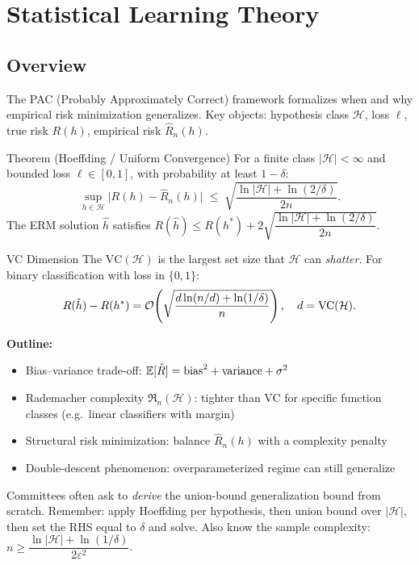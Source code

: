 \section{Statistical Learning Theory}

\subsection{Overview}
The PAC (Probably Approximately Correct) framework formalizes when and why empirical risk
minimization generalizes. Key objects: hypothesis class $\mathcal{H}$, loss $\ell$,
true risk $R(h)$, empirical risk $\hat{R}_n(h)$.

\begin{keyresult}{Theorem (Hoeffding / Uniform Convergence)}
For a finite class $|\mathcal{H}|<\infty$ and bounded loss
$\ell\in[0,1]$, with probability at least $1-\delta$:
\[
  \sup_{h\in\mathcal{H}}\bigl|R(h)-\hat{R}_n(h)\bigr|
  \;\le\; \sqrt{\frac{\ln|\mathcal{H}|+\ln(2/\delta)}{2n}}.
\]
The ERM solution $\hat{h}$ satisfies
$R(\hat{h}) \le R(h^*) + 2\sqrt{\dfrac{\ln|\mathcal{H}|+\ln(2/\delta)}{2n}}$.
\end{keyresult}

\begin{defbox}{VC Dimension}
The  $\mathrm{VC}(\mathcal{H})$ is the largest set size that
$\mathcal{H}$ can \emph{shatter}. For binary classification with loss in $\{0,1\}$:
\[
  R(\hat{h})-R(h^*) = \mathcal{O}\!\left(\sqrt{\frac{d\ln(n/d)+\ln(1/\delta)}{n}}\right),
  \quad d = \mathrm{VC}(\mathcal{H}).
\]
\end{defbox}

\textbf{Outline:}
\begin{itemize}
  \item Bias–variance trade-off: $\mathbb{E}[\hat{R}] = \text{bias}^2 + \text{variance} + \sigma^2$
  \item Rademacher complexity $\mathfrak{R}_n(\mathcal{H})$: tighter than VC for
        specific function classes (e.g.\ linear classifiers with margin)
  \item Structural risk minimization: balance $\hat{R}_n(h)$ with a complexity penalty
  \item Double-descent phenomenon: overparameterized regime can still generalize
\end{itemize}

\begin{examtip}
Committees often ask to \emph{derive} the union-bound generalization bound from scratch.
Remember: apply Hoeffding per hypothesis, then union bound over $|\mathcal{H}|$, then
set the RHS equal to $\delta$ and solve. Also know the sample complexity:
$n \ge \dfrac{\ln|\mathcal{H}|+\ln(1/\delta)}{2\varepsilon^2}$.
\end{examtip}

